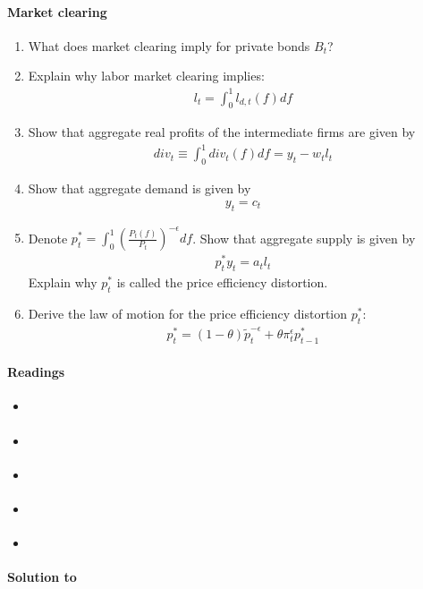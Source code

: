 \paragraph{Market clearing}
\begin{enumerate}[resume]
	\item What does market clearing imply for private bonds \(B_t\)?
	\item Explain why labor market clearing implies:
	\begin{align*}
		l_t = \int_0^1 l_{d,t}(f) df
	\end{align*}
	\item Show that aggregate real profits of the intermediate firms are given by
	\begin{align*}
	div_t \equiv \int_{0}^{1} div_t(f) df = y_t - w_t l_t
	\end{align*}
	\item Show that aggregate demand is given by
	\begin{align}
	y_t = c_t
	\end{align}
	\item Denote \(p_t^* = \int_{0}^1 {\left(\frac{P_t(f)}{P_t}\right)}^{-\epsilon} df\).
	Show that aggregate supply is given by
	\begin{align*}
	p_t^* y_t = a_t l_t
	\end{align*}
	Explain why \(p_t^*\) is called the price efficiency distortion.
	\item Derive the law of motion for the price efficiency distortion \(p_t^*\):
	\begin{align}
	p_{t}^*=\left(1-\theta\right) \widetilde{p}_t^{-\epsilon}+\theta \pi_{t}^{\epsilon} p_{t-1}^*
	\end{align}
\end{enumerate}

\paragraph{Readings}
\begin{itemize}
	\item \textcite[Ch.~3]{Gali_2015_MonetaryPolicyInflation}
	\item \textcite[Ch.~19]{Heijdra_2017_FoundationsModernMacroeconomics}
	\item \textcite[Ch.~7]{Romer_2019_AdvancedMacroeconomics}
	\item \textcite[Ch.~3]{Woodford_2003_InterestPricesFoundations}	
	\item \textcite[Ch.~8]{Walsh_2017_MonetaryTheoryPolicy}
\end{itemize}

\begin{solution}\textbf{Solution to }
\ifDisplaySolutions%

\fi
\newpage
\end{solution}
